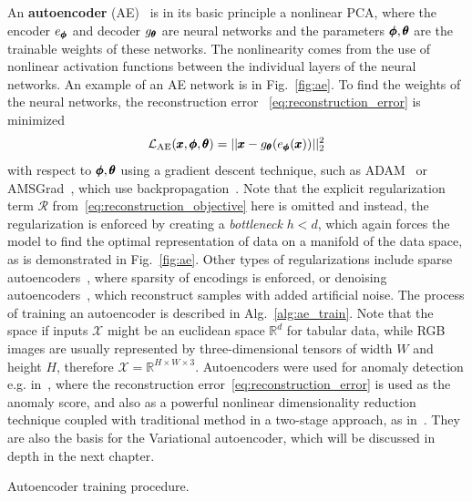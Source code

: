 An \textbf{autoencoder} (AE)~\cite{kramer1991nonlinear} is in its basic principle a nonlinear PCA, where the encoder $e_{\pmb{{\phi}}}$ and decoder $g_{\pmb{{\theta}}}$ are neural networks and the parameters $\pmb{{\phi}},\pmb{{\theta}}$ are the trainable weights of these networks. The nonlinearity comes from the use of nonlinear activation functions between the individual layers of the neural networks. An example of an AE network is in Fig.~\ref{fig:ae}.  To find the weights of the neural networks, the reconstruction error ~\eqref{eq:reconstruction_error} is minimized 
\begin{equation} \label{eq:ae_objective}
\mathcal{L}_{\text{AE}}(\pmb{{x}},\pmb{{\phi}},\pmb{{\theta}}) = \vert \vert \pmb{{x}} - g_{\pmb{{\theta}}}(e_{\pmb{{\phi}}}(\pmb{{x}})) \vert \vert_2^2
\end{equation}
with respect to $\pmb{{\phi}},\pmb{{\theta}}$ using a gradient descent technique, such as ADAM~\cite{kingma2014adam} or AMSGrad~\cite{reddi2019convergence}, which use backpropagation~\cite{werbos1982applications}. Note that the explicit regularization term $\mathcal{R}$ from~\eqref{eq:reconstruction_objective} here is omitted and instead, the regularization is enforced by creating a \textit{bottleneck} $h < d$, which again forces the model to find the optimal representation of data on a manifold of the data space, as is demonstrated in Fig.~\ref{fig:ae}. Other types of regularizations include sparse autoencoders~\cite{deng2013sparse}, where sparsity of encodings is enforced, or denoising autoencoders~\cite{lu2013speech}, which reconstruct samples with added artificial noise. The process of training an autoencoder is described in Alg.~\ref{alg:ae_train}. Note that the space if inputs $\mathcal{X}$ might be an euclidean space $\mathbb{R}^d$ for tabular data, while RGB images are usually represented by three-dimensional tensors of width $W$ and height $H$, therefore $\mathcal{X} = \mathbb{R}^{H \times W\times3}$. Autoencoders were used for anomaly detection e.g. in~\cite{sakurada2014anomaly,thompson2002implicit}, where the reconstruction error~\eqref{eq:reconstruction_error} is used as the anomaly score, and also as a powerful nonlinear dimensionality reduction technique coupled with traditional method in a two-stage approach, as in~\cite{erfani2016high, amarbayasgalan2018unsupervised}. They are also the basis for the Variational autoencoder, which will be discussed in depth in the next chapter.

\begin{algorithm}
\caption{Autoencoder training procedure.}
\label{alg:ae_train}
\end{algorithm}

